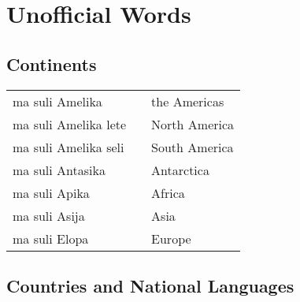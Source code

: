 
\section{Unofficial Words}
\label{unofficial_words}

\subsection*{Continents}

\begin{supertabular}{p{4,5cm}|ll}
    ma suli Amelika      &  & the Americas  \\
    ma suli Amelika lete &  & North America \\
    ma suli Amelika seli &  & South America \\
    ma suli Antasika     &  & Antarctica    \\
    ma suli Apika        &  & Africa        \\
    ma suli Asija        &  & Asia          \\
    ma suli Elopa        &  & Europe        \\
\end{supertabular}

\subsection*{Countries and National Languages}

